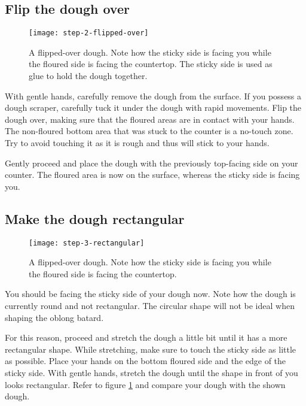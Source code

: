 \subsection[Flipping the dough]{Flip the dough over}

\begin{figure}[!htb]
  \texttt{[image: step-2-flipped-over]}
  \caption{A flipped-over dough. Note how the sticky side is facing
  you while the floured side is facing the countertop. The sticky side
  is used as glue to hold the dough together.}
\end{figure}

With gentle hands, carefully remove the dough from the surface. If
you possess a dough scraper, carefully tuck it under the dough with
rapid movements. Flip the dough over, making sure that the floured
areas are in contact with your hands. The non-floured bottom area that was
stuck to the counter is a no-touch zone. Try to avoid touching it
as it is rough and thus will stick to your hands.

Gently proceed and place the dough with the previously top-facing side
on your counter. The floured area is now on the surface, whereas the
sticky side is facing you.

\subsection[Create rectangular shape]{Make the dough rectangular}

\begin{figure}[htb!]
  \texttt{[image: step-3-rectangular]}
  \caption{A flipped-over dough. Note how the sticky side is facing
  you while the floured side is facing the countertop.}
  \label{fig:shaping-rectangular-dough}
\end{figure}

You should be facing the sticky side of your dough now. Note how
the dough is currently round and not rectangular. The circular
shape will not be ideal when shaping the oblong batard.

For this reason, proceed and stretch the dough a little bit until
it has a more rectangular shape. While stretching, make sure to touch
the sticky side as little as possible. Place your hands on the bottom
floured side and the edge of the sticky side. With gentle hands,
stretch the dough until the shape in front of you looks rectangular.
Refer to figure \ref{fig:shaping-rectangular-dough} and compare
your dough with the shown dough.

